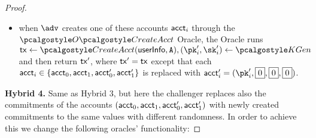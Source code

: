 \begin{proof}
\begin{itemize}
    \item when $\adv$ creates one of these accounts $\textup{\textsf{acct}}_i$ through the $\createAcctOracle$ Oracle, the Oracle runs $\txn \gets \createAcct(\userinfo, \anset), (\pk_i^\prime, \sk_i^\prime) \gets \kgen$ and then return $\textup{\textsf{tx}}^\prime$, where $\textup{\textsf{tx}}^\prime = \textup{\textsf{tx}}$ except that each $\textup{\textsf{acct}}_i \in \{\textup{\textsf{acct}}_0, \textup{\textsf{acct}}_1, \textup{\textsf{acct}}_0^\prime, \textup{\textsf{acct}}_1^\prime\}$ is replaced with 
    $\acct_i^\prime = (\pk_i^\prime, \comm{0}, \comm{0}, \comm{0})$.\\
\end{itemize}
% 
\textbf{Hybrid 4.} Same as Hybrid 3, but here the challenger replaces also the commitments of the accounts $(\textup{\textsf{acct}}_0, \textup{\textsf{acct}}_1, \textup{\textsf{acct}}_0^\prime, \textup{\textsf{acct}}_1^\prime)$ with newly created commitments to the same values with different randomness. 
In order to achieve this we change the following oracles' functionality:
\end{proof}
